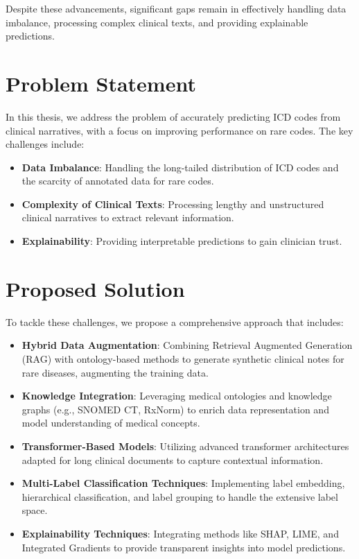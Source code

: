 \documentclass[12pt,a4paper]{report}
\begin{document}
Despite these advancements, significant gaps remain in effectively handling data imbalance, processing complex clinical texts, and providing explainable predictions.

\section{Problem Statement}
In this thesis, we address the problem of accurately predicting ICD codes from clinical narratives, with a focus on improving performance on rare codes. The key challenges include:
\begin{itemize}
    \item \textbf{Data Imbalance}: Handling the long-tailed distribution of ICD codes and the scarcity of annotated data for rare codes.
    \item \textbf{Complexity of Clinical Texts}: Processing lengthy and unstructured clinical narratives to extract relevant information.
    \item \textbf{Explainability}: Providing interpretable predictions to gain clinician trust.
\end{itemize}

\section{Proposed Solution}
To tackle these challenges, we propose a comprehensive approach that includes:
\begin{itemize}
    \item \textbf{Hybrid Data Augmentation}: Combining Retrieval Augmented Generation (RAG) with ontology-based methods to generate synthetic clinical notes for rare diseases, augmenting the training data.
    \item \textbf{Knowledge Integration}: Leveraging medical ontologies and knowledge graphs (e.g., SNOMED CT, RxNorm) to enrich data representation and model understanding of medical concepts.
    \item \textbf{Transformer-Based Models}: Utilizing advanced transformer architectures adapted for long clinical documents to capture contextual information.
    \item \textbf{Multi-Label Classification Techniques}: Implementing label embedding, hierarchical classification, and label grouping to handle the extensive label space.
    \item \textbf{Explainability Techniques}: Integrating methods like SHAP, LIME, and Integrated Gradients to provide transparent insights into model predictions.
\end{itemize}
\end{document}
